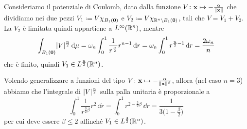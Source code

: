 \begin{esempio} \label{es:schroedinger-potenziale-coulomb}
    Consideriamo il potenziale di Coulomb, dato dalla funzione $V\colon\vec x\mapsto-\frac{\alpha}{\norm{\vec x}}$ che dividiamo nei due pezzi $V_1\defeq V\chi_{B_1(\vec 0)}$ e $V_2\defeq V\chi_{\R^n\setminus B_1(\vec 0)}$, tali che $V=V_1+V_2$.
    La $V_2$ è limitata quindi appartiene a $\leb[\infty]{\R^n}$, mentre
    \begin{equation}
        \int_{B_1(\vec 0)}\abs{V}^\frac{n}2\,\dd\mu=
        \omega_n\int_0^1\frac1{r^\frac{n}2}r^{n-1}\,\dd r=
        \omega_n\int_0^1r^{\frac{n}2-1}\,\dd r=
        \frac{2\omega_n}{n}
    \end{equation}
    che è finito, quindi $V_1\in\leb[\frac{n}2]{\R^n}$.

    Volendo generalizzare a funzioni del tipo $V\colon\vec x\mapsto-\frac{\alpha}{\norm{\vec x}^\beta}$, allora (nel caso $n=3$) abbiamo che l'integrale di $\abs{V}^\frac{n}2$ sulla palla unitaria è proporzionale a
    \begin{equation}
        \int_0^1\frac1{r^{\frac32\beta}}r^2\,\dd r=
        \int_0^1r^{2-\frac32\beta}\,\dd r=
        \frac1{3\bigl(1-\frac{\beta}2\bigr)}
    \end{equation}
    per cui deve essere $\beta\le 2$ affinch\'e $V_1\in\leb[\frac32]{\R^n}$.
\end{esempio}
